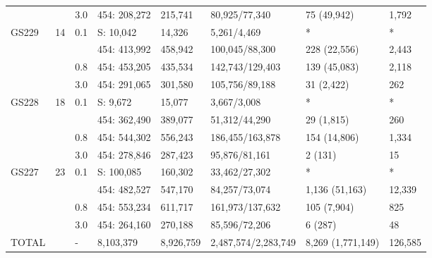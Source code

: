 \begin{table}
\begin{tabularx}{\textwidth}{p{0.6cm}p{0.7cm}p{0.5cm}p{1.8cm}p{1cm}Xp{2.4cm}p{1.4cm}}
      &      & 3.0 & 454: 208,272    & 215,741 & 80,925/77,340    & 75 (49,942)     & 1,792  \\ 
GS229 & 14   & 0.1 & S: 10,042   & 14,326  & 5,261/4,469      & *               & *      \\
      &      &     & 454: 413,992    & 458,942 & 100,045/88,300   & 228 (22,556)    & 2,443  \\
      &      & 0.8 & 454: 453,205    & 435,534 & 142,743/129,403  & 139 (45,083)    & 2,118  \\
      &      & 3.0 & 454: 291,065    & 301,580 & 105,756/89,188   & 31 (2,422)      & 262    \\ 
GS228 & 18   & 0.1 & S: 9,672    & 15,077  & 3,667/3,008      & *               & *      \\
      &      &     & 454: 362,490    & 389,077 & 51,312/44,290    & 29 (1,815)      & 260    \\
      &      & 0.8 & 454: 544,302    & 556,243 & 186,455/163,878  & 154 (14,806)    & 1,334  \\
      &      & 3.0 & 454: 278,846    & 287,423 & 95,876/81,161    & 2 (131)         & 15     \\ 
GS227 & 23   & 0.1 & S: 100,085 & 160,302 & 33,462/27,302    & *               & *      \\
      &      &     & 454: 482,527    & 547,170 & 84,257/73,074    & 1,136 (51,163)  & 12,339 \\
      &      & 0.8 & 454: 553,234    & 611,717 & 161,973/137,632  & 105 (7,904)     & 825    \\
      &      & 3.0 & 454: 264,160    & 270,188 & 85,596/72,206    & 6 (287)         & 48     \\ 
TOTAL &      & -   & 8,103,379       & 8,926,759 & 2,487,574/2,283,749 & 8,269 (1,771,149) & 126,585 \\ 
\bottomrule
\end{tabularx}
\end{table}
